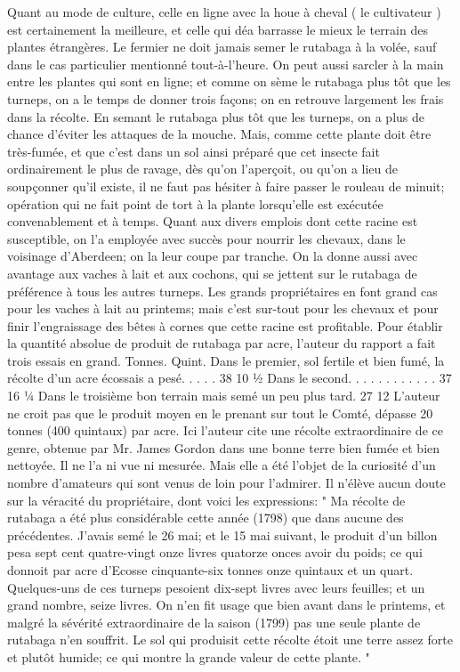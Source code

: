 Quant au mode de culture, celle en ligne avec la houe à cheval ( le cultivateur ) est certainement la meilleure, et celle qui déa\setcounter{page}{380} barrasse le mieux le terrain des plantes étrangères. Le fermier ne doit jamais semer le rutabaga à la volée, sauf dans le cas particulier mentionné tout-à-l'heure.
On peut aussi sarcler à la main entre les plantes qui sont en ligne; et comme on sème le rutabaga plus tôt que les turneps, on a le temps de donner trois façons; on en retrouve largement les frais dans la récolte.
En semant le rutabaga plus tôt que les turneps, on a plus de chance d'éviter les attaques de la mouche. Mais, comme cette plante doit être très-fumée, et que c'est dans un sol ainsi préparé que cet insecte fait ordinairement le plus de ravage, dès qu'on l'aperçoit, ou qu'on a lieu de soupçonner qu'il existe, il ne faut pas hésiter à faire passer le rouleau de minuit; opération qui ne fait point de tort à la plante lorsqu'elle est exécutée convenablement et à temps.
Quant aux divers emplois dont cette racine est susceptible, on l'a employée avec succès pour nourrir les chevaux, dans le voisinage d'Aberdeen; on la leur coupe par tranche. On la donne aussi avec avantage aux vaches à lait et aux cochons, qui se jettent sur le rutabaga de préférence à tous les autres turneps. Les grands propriétaires\setcounter{page}{381} en font grand cas pour les vaches à lait au printems; mais c'est sur-tout pour les chevaux et pour finir l'engraissage des bêtes à cornes que cette racine est profitable.
Pour établir la quantité absolue de produit de rutabaga par acre, l'auteur du rapport a fait trois essais en grand.
Tonnes. Quint.
Dans le premier, sol fertile et bien fumé, la récolte d'un acre écossais a pesé. . . . . 38 10 ½
Dans le second. . . . . . . . . . . . 37 16 ¼
Dans le troisième bon terrain mais semé un peu plus tard. 27 12
L'auteur ne croit pas que le produit moyen en le prenant sur tout le Comté, dépasse 20 tonnes (400 quintaux) par acre.
Ici l'auteur cite une récolte extraordinaire de ce genre, obtenue par Mr. James Gordon dans une bonne terre bien fumée et bien nettoyée. Il ne l'a ni vue ni mesurée. Mais elle a été l'objet de la curiosité d'un nombre d'amateurs qui sont venus de loin pour l'admirer. Il n'élève aucun doute sur la véracité du propriétaire, dont voici les expressions:
" Ma récolte de rutabaga a été plus considérable cette année (1798) que dans aucune des précédentes. J'avais semé le 26\setcounter{page}{382} mai; et le 15 mai suivant, le produit d'un billon pesa sept cent quatre-vingt onze livres quatorze onces avoir du poids; ce qui donnoit par acre d'Ecosse cinquante-six tonnes onze quintaux et un quart. Quelques-uns de ces turneps pesoient dix-sept livres avec leurs feuilles; et un grand nombre, seize livres. On n'en fit usage que bien avant dans le printems, et malgré la sévérité extraordinaire de la saison (1799) pas une seule plante de rutabaga n'en souffrit. Le sol qui produisit cette récolte étoit une terre assez forte et plutôt humide; ce qui montre la grande valeur de cette plante. "
